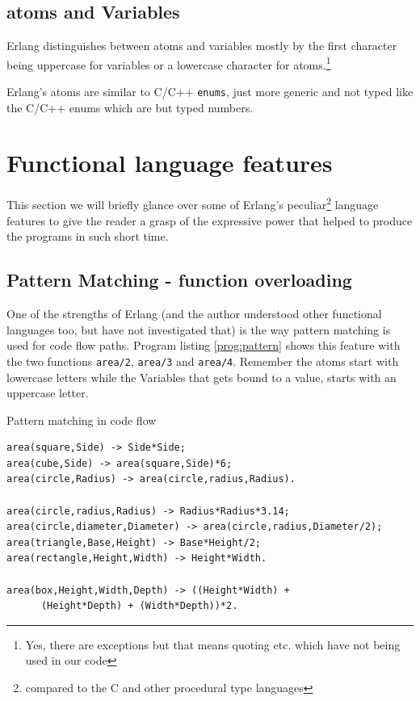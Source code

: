 \documentclass[a4paper,11pt]{report}
\begin{document}
\subsection{atoms and Variables}

Erlang distinguishes between atoms and variables mostly by the first
character being uppercase for variables or a lowercase character for
atoms.\footnote{Yes, there are exceptions but that means quoting
  etc. which have not being used in our code}

Erlang's atoms are similar to C/C++ \texttt{enums}, just more generic
and not typed like the C/C++ enums which are but typed numbers.


\section{Functional language features}

This section we will briefly glance over some of Erlang's
peculiar\footnote{compared to the C and other procedural type
  languages} language features to give the reader a grasp of the
expressive power that helped to produce the programs in such short
time.

\subsection{Pattern Matching - function overloading}
\label{sec:pattern}

One of the strengths of Erlang (and the author understood other
functional languages too, but have not investigated that) is the way
pattern matching is used for code flow paths. Program listing
\ref{prog:pattern} shows this feature with the two functions
\texttt{area/2}, \texttt{area/3} and \texttt{area/4}. Remember the
atoms start with lowercase letters while the Variables that gets bound
to a value, starts with an uppercase letter.

\begin{Program}
\caption{Pattern matching in code flow}
\label{prog:pattern}
\begin{lstlisting}
area(square,Side) -> Side*Side;
area(cube,Side) -> area(square,Side)*6;
area(circle,Radius) -> area(circle,radius,Radius).

area(circle,radius,Radius) -> Radius*Radius*3.14;
area(circle,diameter,Diameter) -> area(circle,radius,Diameter/2);
area(triangle,Base,Height) -> Base*Height/2;
area(rectangle,Height,Width) -> Height*Width.

area(box,Height,Width,Depth) -> ((Height*Width) +
      (Height*Depth) + (Width*Depth))*2.
\end{lstlisting}
\end{Program}
\end{document}
